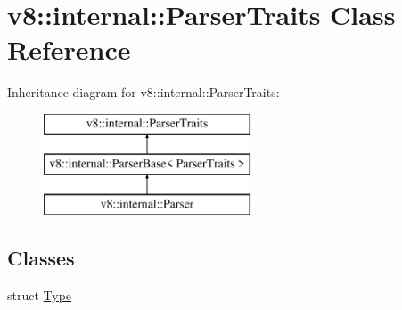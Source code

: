 \hypertarget{classv8_1_1internal_1_1_parser_traits}{}\section{v8\+:\+:internal\+:\+:Parser\+Traits Class Reference}
\label{classv8_1_1internal_1_1_parser_traits}
Inheritance diagram for v8\+:\+:internal\+:\+:Parser\+Traits\+:\begin{figure}[H]
\begin{center}
\leavevmode
\includegraphics[height=3.000000cm]{classv8_1_1internal_1_1_parser_traits}
\end{center}
\end{figure}
\subsection*{Classes}
\begin{DoxyCompactItemize}
\item 
struct \hyperlink{structv8_1_1internal_1_1_parser_traits_1_1_type}{Type}
\end{DoxyCompactItemize}
